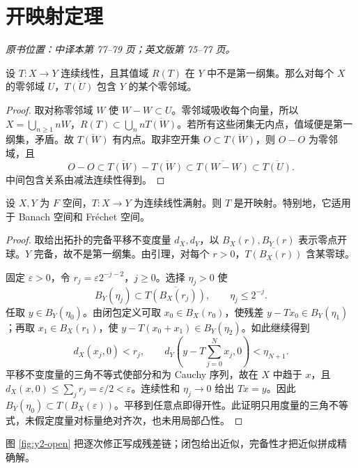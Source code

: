 \section{开映射定理}\label{sec:yosida-02-05}
\noindent\textit{原书位置：中译本第 77--79 页；英文版第 75--77 页。}

\begin{lemma}[像的闭包含零邻域]\label{lem:y2-almost-open}
设 $T:X\to Y$ 连续线性，且其值域 $R(T)$ 在 $Y$ 中不是第一纲集。那么对每个 $X$ 的零邻域 $U$，$\overline{T(U)}$ 包含 $Y$ 的某个零邻域。
\end{lemma}
\begin{proof}
取对称零邻域 $W$ 使 $W-W\subset U$。零邻域吸收每个向量，所以 $X=\bigcup_{n\ge1}nW$，$R(T)\subset\bigcup_n n\overline{T(W)}$。若所有这些闭集无内点，值域便是第一纲集，矛盾。故 $\overline{T(W)}$ 有内点。取非空开集 $O\subset\overline{T(W)}$，则 $O-O$ 为零邻域，且
\[
 O-O\subset\overline{T(W)}-\overline{T(W)}
 \subset\overline{T(W-W)}\subset\overline{T(U)}.
\]
中间包含关系由减法连续性得到。
\end{proof}

\begin{theorem}\label{thm:banach-open}
设 $X,Y$ 为 $F$ 空间，$T:X\to Y$ 为连续线性满射。则 $T$ 是开映射。特别地，它适用于 Banach 空间和 Fr\'echet 空间。
\end{theorem}
\begin{proof}
取给出拓扑的完备平移不变度量 $d_X,d_Y$，以 $B_X(r),B_Y(r)$ 表示零点开球。$Y$ 完备，故不是第一纲集。由引理，对每个 $r>0$，$\overline{T(B_X(r))}$ 含某零球。

固定 $\varepsilon>0$，令 $r_j=\varepsilon2^{-j-2}$，$j\ge0$。选择 $\eta_j>0$ 使
\[
 B_Y(\eta_j)\subset\overline{T(B_X(r_j))},\qquad
 \eta_j\le2^{-j}.
\]
任取 $y\in B_Y(\eta_0)$。由闭包定义可取 $x_0\in B_X(r_0)$，使残差 $y-Tx_0\in B_Y(\eta_1)$；再取 $x_1\in B_X(r_1)$，使 $y-T(x_0+x_1)\in B_Y(\eta_2)$。如此继续得到
\[
 d_X(x_j,0)<r_j,\qquad
 d_Y\left(y-T\sum_{j=0}^Nx_j,0\right)<\eta_{N+1}.
\]
平移不变度量的三角不等式使部分和为 Cauchy 序列，故在 $X$ 中趋于 $x$，且 $d_X(x,0)\le\sum_jr_j=\varepsilon/2<\varepsilon$。连续性和 $\eta_j\to0$ 给出 $Tx=y$。因此 $B_Y(\eta_0)\subset T(B_X(\varepsilon))$。平移到任意点即得开性。此证明只用度量的三角不等式，未假定度量对标量绝对齐次，也未用局部凸性。
\end{proof}

图 \ref{fig:y2-open} 把逐次修正写成残差链；闭包给出近似，完备性才把近似拼成精确解。



